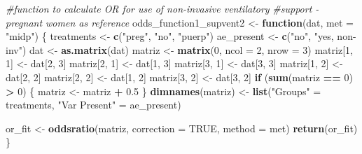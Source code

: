 \documentclass[
]{article}
\newenvironment{Shaded}{\begin{snugshade}}{\end{snugshade}}
\newcommand{\CommentTok}[1]{\textcolor[rgb]{0.56,0.35,0.01}{\textit{#1}}}
\newcommand{\ControlFlowTok}[1]{\textcolor[rgb]{0.13,0.29,0.53}{\textbf{#1}}}
\newcommand{\DataTypeTok}[1]{\textcolor[rgb]{0.13,0.29,0.53}{#1}}
\newcommand{\DecValTok}[1]{\textcolor[rgb]{0.00,0.00,0.81}{#1}}
\newcommand{\FloatTok}[1]{\textcolor[rgb]{0.00,0.00,0.81}{#1}}
\newcommand{\KeywordTok}[1]{\textcolor[rgb]{0.13,0.29,0.53}{\textbf{#1}}}
\newcommand{\NormalTok}[1]{#1}
\newcommand{\OperatorTok}[1]{\textcolor[rgb]{0.81,0.36,0.00}{\textbf{#1}}}
\newcommand{\OtherTok}[1]{\textcolor[rgb]{0.56,0.35,0.01}{#1}}
\newcommand{\StringTok}[1]{\textcolor[rgb]{0.31,0.60,0.02}{#1}}
\begin{document}
\begin{Shaded}
\begin{Highlighting}[]
\CommentTok{#function to calculate OR for use of non-invasive ventilatory }
\CommentTok{#support - pregnant women as reference}
\NormalTok{odds_function1_supvent2 <-}\StringTok{ }\ControlFlowTok{function}\NormalTok{(dat, }\DataTypeTok{met =} \StringTok{"midp"}\NormalTok{) \{}
\NormalTok{  treatments <-}\StringTok{ }\KeywordTok{c}\NormalTok{(}\StringTok{"preg"}\NormalTok{, }\StringTok{"no"}\NormalTok{, }\StringTok{"puerp"}\NormalTok{)}
\NormalTok{  ae_present <-}\StringTok{ }\KeywordTok{c}\NormalTok{(}\StringTok{"no"}\NormalTok{, }\StringTok{"yes, non-inv"}\NormalTok{)}
\NormalTok{  dat <-}\StringTok{ }\KeywordTok{as.matrix}\NormalTok{(dat)}
\NormalTok{  matriz <-}\StringTok{ }\KeywordTok{matrix}\NormalTok{(}\DecValTok{0}\NormalTok{, }\DataTypeTok{ncol =} \DecValTok{2}\NormalTok{, }\DataTypeTok{nrow =} \DecValTok{3}\NormalTok{)}
\NormalTok{  matriz[}\DecValTok{1}\NormalTok{, }\DecValTok{1}\NormalTok{] <-}\StringTok{ }\NormalTok{dat[}\DecValTok{2}\NormalTok{, }\DecValTok{3}\NormalTok{]}
\NormalTok{  matriz[}\DecValTok{2}\NormalTok{, }\DecValTok{1}\NormalTok{] <-}\StringTok{ }\NormalTok{dat[}\DecValTok{1}\NormalTok{, }\DecValTok{3}\NormalTok{]}
\NormalTok{  matriz[}\DecValTok{3}\NormalTok{, }\DecValTok{1}\NormalTok{] <-}\StringTok{ }\NormalTok{dat[}\DecValTok{3}\NormalTok{, }\DecValTok{3}\NormalTok{]}
\NormalTok{  matriz[}\DecValTok{1}\NormalTok{, }\DecValTok{2}\NormalTok{] <-}\StringTok{ }\NormalTok{dat[}\DecValTok{2}\NormalTok{, }\DecValTok{2}\NormalTok{]}
\NormalTok{  matriz[}\DecValTok{2}\NormalTok{, }\DecValTok{2}\NormalTok{] <-}\StringTok{ }\NormalTok{dat[}\DecValTok{1}\NormalTok{, }\DecValTok{2}\NormalTok{]}
\NormalTok{  matriz[}\DecValTok{3}\NormalTok{, }\DecValTok{2}\NormalTok{] <-}\StringTok{ }\NormalTok{dat[}\DecValTok{3}\NormalTok{, }\DecValTok{2}\NormalTok{]}
  \ControlFlowTok{if}\NormalTok{ (}\KeywordTok{sum}\NormalTok{(matriz }\OperatorTok{==}\StringTok{ }\DecValTok{0}\NormalTok{) }\OperatorTok{>}\StringTok{ }\DecValTok{0}\NormalTok{) \{}
\NormalTok{    matriz <-}\StringTok{ }\NormalTok{matriz }\OperatorTok{+}\StringTok{ }\FloatTok{0.5}
\NormalTok{  \}}
  \KeywordTok{dimnames}\NormalTok{(matriz) <-}\StringTok{ }\KeywordTok{list}\NormalTok{(}\StringTok{"Groups"}\NormalTok{ =}\StringTok{ }\NormalTok{treatments,}
                           \StringTok{"Var Present"}\NormalTok{ =}\StringTok{ }\NormalTok{ae_present)}
  
\NormalTok{  or_fit <-}\StringTok{ }\KeywordTok{oddsratio}\NormalTok{(matriz, }\DataTypeTok{correction =} \OtherTok{TRUE}\NormalTok{, }\DataTypeTok{method =}\NormalTok{ met)}
  \KeywordTok{return}\NormalTok{(or_fit)}
\NormalTok{\}}
\end{Highlighting}
\end{Shaded}
\end{document}
